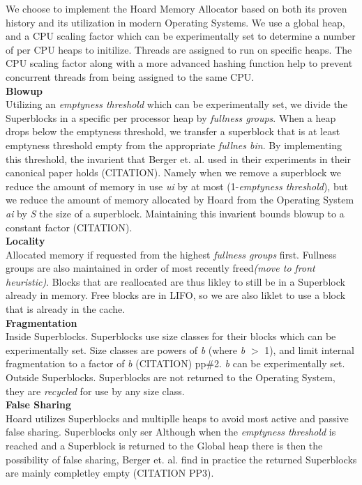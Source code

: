 \documentclass[11pt]{article}
\begin{document}
\indent \indent We choose to implement the Hoard Memory Allocator based on both its proven history and its utilization in modern Operating Systems.  We use a global heap, and a CPU scaling factor which can be experimentally set to determine a number of per CPU heaps to initilize.  Threads are assigned to run on specific heaps.  The CPU scaling factor along with a more advanced hashing function help to prevent concurrent threads from being assigned to the same CPU.
\\
\newpage
\noindent
\textbf{Blowup}
\\
\indent  Utilizing an \textit{emptyness threshold} which can be experimentally set, we divide the Superblocks in a specific per processor heap by \textit{fullness groups}.  When a heap drops below the emptyness threshold, we transfer a superblock that is at least emptyness threshold empty from the appropriate \textit{fullnes bin}.  By implementing this threshold, the invarient that Berger et. al. used in their experiments in their canonical paper holds (CITATION).  Namely when we remove a superblock we reduce the amount of memory in use \textit{ui} by at most (1-\textit{emptyness threshold}), but we reduce the amount of memory allocated by Hoard from the Operating System \textit{ai} by \textit{S} the size of a superblock.   Maintaining this invarient bounds blowup to a constant factor (CITATION).  
\\
\textbf{Locality}
\\
\indent Allocated memory if requested from the highest \textit{fullness groups} first.  Fullness groups are also maintained in order of most recently freed\textit{(move to front heuristic)}.  Blocks that are reallocated are thus likley to still be in a Superblock already in memory.  Free blocks are in LIFO, so we are also liklet to use a block that is already in the cache.
\\
\textbf{Fragmentation}
\\
\indent Inside Superblocks.  Superblocks use size classes for their blocks which can be experimentally set.  Size classes are powers of \textit{b} (where \textit{b} $>$ 1), and limit internal fragmentation to a factor of \textit{b} (CITATION) pp\#2. \textit{b} can be experimentally set.  
\\
\indent Outside Superblocks.  Superblocks are not returned to the Operating System, they are \textit{recycled} for use by any size class.
\\
\textbf{False Sharing}
\\
\indent Hoard utilizes Superblocks and multiplle heaps to avoid most active and passive false sharing.   Superblocks only ser   Although when the \textit{emptyness threshold} is reached and a Superblock is returned to the Global heap there is then the possibility of false sharing, Berger et. al. find in practice the returned Superblocks are mainly completley empty (CITATION PP3).
\end{document}
